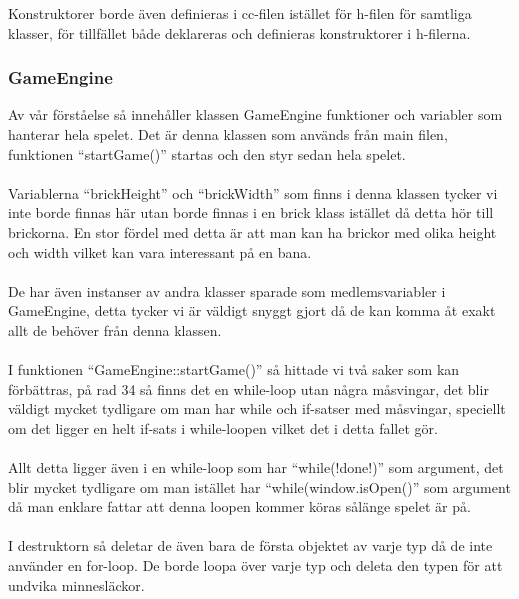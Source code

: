 \documentclass{TDP003mall}
\begin{document}
Konstruktorer borde även definieras i cc-filen istället för h-filen för samtliga klasser, för tillfället både deklareras och definieras konstruktorer i h-filerna.

\subsubsection{GameEngine}
Av vår förståelse så innehåller klassen GameEngine funktioner och variabler som hanterar hela spelet. Det är denna klassen som används från main filen, funktionen ``startGame()'' startas och den styr sedan hela spelet. \\\\
Variablerna ``brickHeight'' och ``brickWidth'' som finns i denna klassen tycker vi inte borde finnas här utan borde finnas i en brick klass istället då detta hör till brickorna. En stor fördel med detta är att man kan ha brickor med olika height och width vilket kan vara interessant på en bana. \\\\
De har även instanser av andra klasser sparade som medlemsvariabler i GameEngine, detta tycker vi är väldigt snyggt gjort då de kan komma åt exakt allt de behöver från denna klassen.
\\\\
I funktionen ``GameEngine::startGame()'' så hittade vi två saker som kan förbättras, på rad 34 så finns det en while-loop utan några måsvingar, det blir väldigt mycket tydligare om man har while och if-satser med måsvingar, speciellt om det ligger en helt if-sats i while-loopen vilket det i detta fallet gör. \\\\
Allt detta ligger även i en while-loop som har ``while(!done!)'' som argument, det blir mycket tydligare om man istället har ``while(window.isOpen()'' som argument då man enklare fattar att denna loopen kommer köras sålänge spelet är på.
\\\\
I destruktorn så deletar de även bara de första objektet av varje typ då de inte använder en for-loop. De borde loopa över varje typ och deleta den typen för att undvika minnesläckor.
\end{document}
